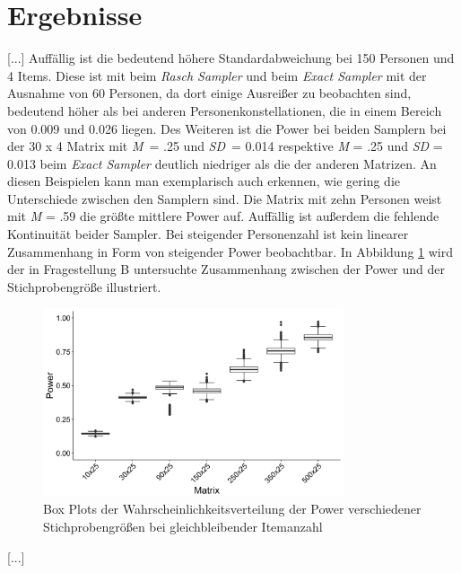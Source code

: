 \documentclass[12pt]{article} %
\begin{document}
\section{Ergebnisse}
[...]
Auffällig ist die bedeutend höhere Standardabweichung bei 150 Personen und 4 Items. Diese ist mit  beim \textit{Rasch Sampler} und  beim \textit{Exact Sampler} mit der Ausnahme von 60 Personen, da dort einige Ausreißer zu beobachten sind, bedeutend höher als bei anderen Personenkonstellationen, die in einem Bereich von 0.009 und 0.026 liegen. Des Weiteren ist die Power bei beiden Samplern bei der 30 x 4 Matrix mit \textit{M} = .25 und \textit{SD} = 0.014 respektive \textit{M} = .25 und \textit{SD} = 0.013 beim \textit{Exact Sampler} deutlich niedriger als die der anderen Matrizen. An diesen Beispielen kann man exemplarisch auch erkennen, wie gering die Unterschiede zwischen den Samplern sind. Die Matrix mit zehn Personen weist mit \textit{M} = .59 die größte mittlere Power auf. Auffällig ist außerdem die fehlende Kontinuität beider Sampler. Bei steigender Personenzahl ist kein linearer Zusammenhang in Form von steigender Power beobachtbar. In Abbildung \ref{fig:samplesize} wird der in Fragestellung B untersuchte Zusammenhang zwischen der Power und der Stichprobengröße illustriert. 
\begin{figure}[ht]
	\includegraphics[width=0.79\textwidth]{B.jpeg}
	\caption{Box Plots der Wahrscheinlichkeitsverteilung der Power verschiedener Stichprobengrößen bei gleichbleibender Itemanzahl}
	\label{fig:samplesize}
\end{figure}
[...]
\end{document}
